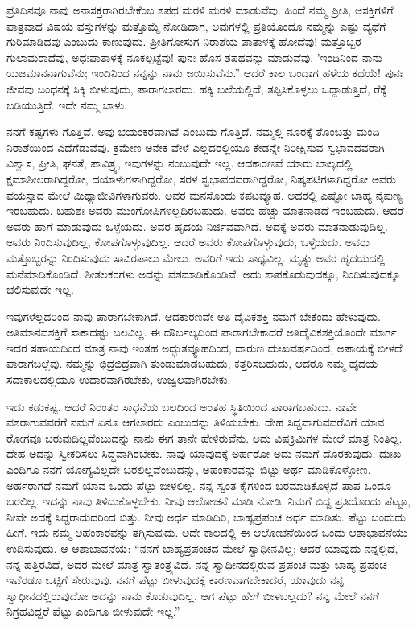 ಪ್ರತಿದಿನವೂ ನಾವು ಅನಾಸಕ್ತರಾಗಿರಬೇಕೆಂಬ ಶಪಥ ಮರಳಿ ಮರಳಿ ಮಾಡುವೆವು. ಹಿಂದೆ ನಮ್ಮ ಪ್ರೀತಿ, ಆಸಕ್ತಿಗಳಿಗೆ ಪಾತ್ರವಾದ ವಿಷಯ ವಸ್ತುಗಳನ್ನು ಮತ್ತೊಮ್ಮೆ ನೋಡಿದಾಗ, ಅವುಗಳಲ್ಲಿ ಪ್ರತಿಯೊಂದೂ ನಮ್ಮನ್ನು ಎಷ್ಟು ವ್ಯಥೆಗೆ ಗುರಿಮಾಡಿದವು ಎಂಬುದು ಕಾಣುವುದು. ಪ್ರೀತಿಗೋಸುಗ ನಿರಾಶೆಯ ಪಾತಾಳಕ್ಕೆ ಹೋದೆವು! ಮತ್ತೊಬ್ಬರ ಗುಲಾಮರಾದೆವು, ಅಧಃಪಾತಾಳಕ್ಕೆ ನೂಕಲ್ಪಟ್ಟೆವು! ಪುನಃ ಹೊಸ ಶಪಥವನ್ನು ಮಾಡುವೆವು. 'ಇಂದಿನಿಂದ ನಾನು ಯಜಮಾನನಾಗುವೆನು; ಇಂದಿನಿಂದ ನನ್ನನ್ನು ನಾನು ಜಯಿಸುವೆನು.'' ಆದರೆ ಕಾಲ ಬಂದಾಗ ಹಳೆಯ ಕಥೆಯೆ! ಪುನಃ ಜೀವವು ಬಂಧನಕ್ಕೆ ಸಿಕ್ಕಿ ಬೀಳುವುದು, ಪಾರಾಗಲಾರದು. ಹಕ್ಕಿ ಬಲೆಯಲ್ಲಿದೆ, ತಪ್ಪಿಸಿಕೊಳ್ಳಲು ಒದ್ದಾಡುತ್ತಿದೆ, ರೆಕ್ಕೆ ಬಡಿಯುತ್ತಿದೆ. ಇದೇ ನಮ್ಮ ಬಾಳು.

ನನಗೆ ಕಷ್ಟಗಳು ಗೊತ್ತಿವೆ. ಅವು ಭಯಂಕರವಾಗಿವೆ ಎಂಬುದು ಗೊತ್ತಿದೆ. ನಮ್ಮಲ್ಲಿ ನೂರಕ್ಕೆ ತೊಂಬತ್ತು ಮಂದಿ ನಿರಾಶೆಯಿಂದ ಎದೆಗೆಡುವೆವು. ಕ್ರಮೇಣ ಅನೇಕ ವೇಳೆ ಎಲ್ಲದರಲ್ಲಿಯೂ ಕೇಡನ್ನೇ ನಿರೀಕ್ಷಿಸುವ ಸ್ವಭಾವದವರಾಗಿ ವಿಶ್ವಾಸ, ಪ್ರೀತಿ, ಘನತೆ, ಪಾವಿತ್ರ್ಯ, ಇವುಗಳನ್ನು ನಂಬುವುದೇ ಇಲ್ಲ. ಆದಕಾರಣವೆ ಯಾರು ಬಾಲ್ಯದಲ್ಲಿ ಕ್ಷಮಾಶೀಲರಾಗಿದ್ದರೋ, ದಯಾಳುಗಳಾಗಿದ್ದರೋ, ಸರಳ ಸ್ವಭಾವದವರಾಗಿದ್ದರೋ, ನಿಷ್ಕಪಟಿಗಳಾಗಿದ್ದರೋ ಅವರು ವಯಸ್ಸಾದ ಮೇಲೆ ಮಿಥ್ಯಾಜೀವಿಗಳಾಗುವರು. ಅವರ ಮನಸೊಂದು ಕಪಟವ್ಯೂಹ. ಅದರಲ್ಲಿ ಎಷ್ಟೋ ಬಾಹ್ಯ ನೈಪುಣ್ಯ ಇರಬಹುದು. ಬಹುಶಃ ಅವರು ಮುಂಗೋಪಿಗಳಲ್ಲದಿರಬಹುದು. ಅವರು ಹೆಚ್ಚು ಮಾತನಾಡದೆ ಇರಬಹುದು. ಆದರೆ ಅವರು ಹಾಗೆ ಮಾಡುವುದು ಒಳ್ಳೆಯದು. ಅವರ ಹೃದಯ ನಿರ್ಜಿವವಾಗಿದೆ. ಅದಕ್ಕೆ ಅವರು ಮಾತನಾಡುವುದಿಲ್ಲ. ಅವರು ನಿಂದಿಸುವುದಿಲ್ಲ, ಕೋಪಗೊಳ್ಳುವುದಿಲ್ಲ. ಆದರೆ ಅವರು ಕೋಪಗೊಳ್ಳುವುದು, ಒಳ್ಳೆಯದು. ಅವರು ಮತ್ತೊಬ್ಬರನ್ನು ನಿಂದಿಸುವುದು ಸಾವಿರಪಾಲು ಮೇಲು. ಅವರಿಗೆ ಇದು ಸಾಧ್ಯವಿಲ್ಲ. ಮೃತ್ಯು ಅವರ ಹೃದಯದಲ್ಲಿ ಮನೆಮಾಡಿಕೊಂಡಿದೆ. ಶೀತಲಕರಗಳು ಅದನ್ನು ವಶಮಾಡಿಕೊಂಡಿವೆ. ಅದು ಶಾಪಕೊಡುವುದಕ್ಕೂ, ನಿಂದಿಸುವುದಕ್ಕೂ ಚಲಿಸುವುದೇ ಇಲ್ಲ.

ಇವುಗಳೆಲ್ಲದರಿಂದ ನಾವು ಪಾರಾಗಬೇಕಾಗಿದೆ. ಆದಕಾರಣವೇ ಅತಿ ದೈವಿಕಶಕ್ತಿ ನಮಗೆ ಬೇಕೆಂದು ಹೇಳುವುದು. ಅತಿಮಾನವಶಕ್ತಿಗೆ ಸಾಕಾದಷ್ಟು ಬಲವಿಲ್ಲ. ಈ ದೌರ್ಬಲ್ಯದಿಂದ ಪಾರಾಗಬೇಕಾದರೆ ಅತಿದೈವಿಕಶಕ್ತಿಯೊಂದೇ ಮಾರ್ಗ. ಇದರ ಸಹಾಯದಿಂದ ಮಾತ್ರ ನಾವು ಇಂತಹ ಅದ್ಭುತವ್ಯೂಹದಿಂದ, ದಾರುಣ ದುಃಖವರ್ಷದಿಂದ, ಅಪಾಯಕ್ಕೆ ಬೀಳದೆ ಪಾರಾಗಬಲ್ಲೆವು. ನಮ್ಮನ್ನು ಛಿದ್ರಛಿದ್ರವಾಗಿ ತುಂಡುಮಾಡಬಹುದು, ಕತ್ತರಿಸಬಹುದು, ಆದರೂ ನಮ್ಮ ಹೃದಯ ಸದಾಕಾಲದಲ್ಲಿಯೂ ಉದಾರವಾಗಿರಬೇಕು, ಉಜ್ವಲವಾಗಿರಬೇಕು.

ಇದು ಕಡುಕಷ್ಟ. ಆದರೆ ನಿರಂತರ ಸಾಧನೆಯ ಬಲದಿಂದ ಅಂತಹ ಸ್ಥಿತಿಯಿಂದ ಪಾರಾಗಬಹುದು. ನಾವೇ ವಶರಾಗುವವರೆಗೆ ನಮಗೆ ಏನೂ ಆಗಲಾರದು ಎಂಬುದನ್ನು ತಿಳಿಯಬೇಕು. ದೇಹ ಸಿದ್ದವಾಗುವವರೆವಿಗೆ ಯಾವ ರೋಗವೂ ಬರುವುದಿಲ್ಲವೆಂಬುದನ್ನು ನಾನು ಈಗ ತಾನೇ ಹೇಳಿರುವೆನು. ಅದು ವಿಷಕ್ರಿಮಿಗಳ ಮೇಲೆ ಮಾತ್ರ ನಿಂತಿಲ್ಲ. ದೇಹ ಅದನ್ನು ಸ್ವೀಕರಿಸಲು ಸಿದ್ಧವಾಗಿರಬೇಕು. ನಾವು ಯಾವುದಕ್ಕೆ ಅರ್ಹರೋ ಅದು ನಮಗೆ ದೊರಕುವುದು. ದುಃಖ ಎಂದಿಗೂ ನನಗೆ ಯೋಗ್ಯವಿಲ್ಲದೇ ಬರಲಿಲ್ಲವೆಂಬುದನ್ನು, ಅಹಂಕಾರವನ್ನು ಬಿಟ್ಟು ಅರ್ಥ ಮಾಡಿಕೊಳ್ಳೋಣ. ಅರ್ಹರಾಗದೆ ನಮಗೆ ಯಾವ ಒಂದು ಪೆಟ್ಟು ಬೀಳಲಿಲ್ಲ. ನನ್ನ ಸ್ವಂತ ಕೈಗಳಿಂದ ಬರಮಾಡಿಕೊಳ್ಳದೆ ಪಾಪ ಒಂದೂ ಬರಲಿಲ್ಲ. ಇದನ್ನು ನಾವು ತಿಳಿದುಕೊಳ್ಳಬೇಕು. ನೀವು ಆಲೋಚನೆ ಮಾಡಿ ನೋಡಿ, ನಿಮಗೆ ಬಿದ್ದ ಪ್ರತಿಯೊಂದು ಪೆಟ್ಟೂ, ನೀವೇ ಅದಕ್ಕೆ ಸಿದ್ದರಾದುದರಿಂದ ಬಿತ್ತು. ನೀವು ಅರ್ಧ ಮಾಡಿದಿರಿ, ಬಾಹ್ಯಪ್ರಪಂಚ ಅರ್ಧ ಮಾಡಿತು. ಪೆಟ್ಟು ಬಂದುದು ಹೀಗೆ. ಇದು ನಮ್ಮ ಅಹಂಕಾರವನ್ನು ತಗ್ಗಿಸುವುದು. ಅದೇ ಕಾಲದಲ್ಲಿ ಈ ಆಲೋಚನೆಯಿಂದ ಒಂದು ಆಶಾಭಾವನೆಯು ಉದಿಸುವುದು. ಆ ಆಶಾಭಾವನೆಯೆ: “ನನಗೆ ಬಾಹ್ಯಪ್ರಪಂಚದ ಮೇಲೆ ಸ್ವಾಧೀನವಿಲ್ಲ; ಆದರೆ ಯಾವುದು ನನ್ನಲ್ಲಿದೆ, ನನ್ನ ಹತ್ತಿರವಿದೆ, ಅದರ ಮೇಲೆ ಮಾತ್ರ ಸ್ವಾತಂತ್ರ್ಯವಿದೆ. ನನ್ನ ಸ್ವಾಧೀನದಲ್ಲಿರುವ ಪ್ರಪಂಚ ಮತ್ತು ಬಾಹ್ಯ ಪ್ರಪಂಚ ಇವೆರಡೂ ಒಟ್ಟಿಗೆ ಸೇರುವುವು. ನನಗೆ ಪೆಟ್ಟು ಬೀಳುವುದಕ್ಕೆ ಕಾರಣವಾಗಬೇಕಾದರೆ, ಯಾವುದು ನನ್ನ ಸ್ವಾಧೀನದಲ್ಲಿರುವುದೋ ಅದನ್ನು ನಾನು ಕೊಡುವುದಿಲ್ಲ. ಆಗ ಪೆಟ್ಟು ಹೇಗೆ ಬೀಳಬಲ್ಲದು? ನನ್ನ ಮೇಲೆ ನನಗೆ ನಿಗ್ರಹವಿದ್ದರೆ ಪೆಟ್ಟು ಎಂದಿಗೂ ಬೀಳುವುದೇ ಇಲ್ಲ.”

